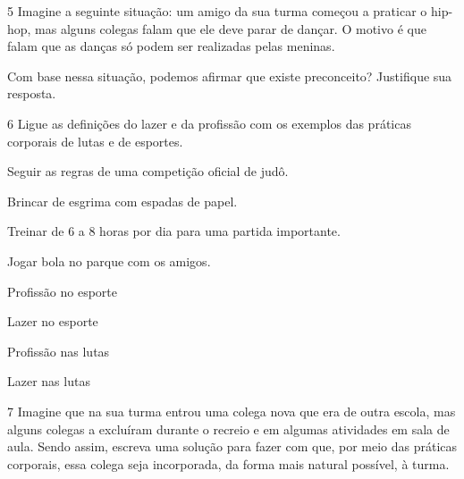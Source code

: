 

\num{5} Imagine a seguinte situação: um amigo da sua turma começou a praticar
  o hip-hop, mas alguns colegas falam que ele deve parar de dançar. O
  motivo é que falam que as danças só podem ser realizadas pelas
  meninas.

Com base nessa situação, podemos afirmar que existe preconceito?
Justifique sua resposta.



\num{6} Ligue as definições do lazer e da profissão com os exemplos das
  práticas corporais de lutas e de esportes.

\begin{multicols}{2}
Seguir as regras de uma competição oficial de judô. 

Brincar de esgrima com espadas de papel. 
 
Treinar de 6 a 8 horas por dia para uma partida importante. 

Jogar bola no parque com os amigos. 

\columnbreak

Profissão no esporte

Lazer no esporte

Profissão nas lutas

Lazer nas lutas
\end{multicols}



\num{7} Imagine que na sua turma entrou uma colega nova que era de outra escola, mas
  alguns colegas a excluíram durante o recreio e em algumas
  atividades em sala de aula. Sendo assim, escreva uma solução para fazer com
  que, por meio das práticas corporais, essa colega seja incorporada, da forma mais natural possível, à turma.

